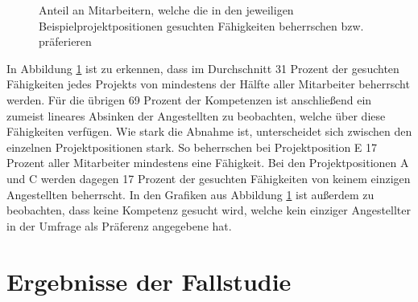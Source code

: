 \begin{figure}[h]
	\centering
	\ContinuedFloat
	
	
	\caption{Anteil an Mitarbeitern, welche die in den jeweiligen Beispielprojektpositionen gesuchten Fähigkeiten beherrschen bzw. präferieren}
\label{fig:ergebnisse:analyse:abb6}
\end{figure}

In Abbildung \ref{fig:ergebnisse:analyse:abb6} ist zu erkennen, dass im Durchschnitt 31 Prozent der gesuchten Fähigkeiten jedes Projekts von mindestens der Hälfte aller Mitarbeiter beherrscht werden. Für die übrigen 69 Prozent der Kompetenzen ist anschließend ein zumeist lineares Absinken der Angestellten zu beobachten, welche über diese Fähigkeiten verfügen. Wie stark die Abnahme ist, unterscheidet sich zwischen den einzelnen Projektpositionen stark. So beherrschen bei Projektposition E 17 Prozent aller Mitarbeiter mindestens eine Fähigkeit. Bei den Projektpositionen A und C werden dagegen 17 Prozent der gesuchten Fähigkeiten von keinem einzigen Angestellten beherrscht. In den Grafiken aus Abbildung \ref{fig:ergebnisse:analyse:abb6} ist außerdem zu beobachten, dass keine Kompetenz gesucht wird, welche kein einziger Angestellter in der Umfrage als Präferenz angegebene hat.

\section{Ergebnisse der Fallstudie}
\label{ch:ergebnisse:fallstudie}


